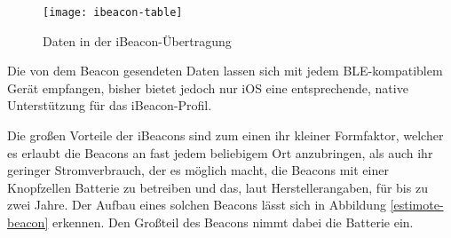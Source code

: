
\begin{figure}[htb!]
		\centering
	\texttt{[image: ibeacon-table]}
	\caption{Daten in der iBeacon-Übertragung}
	\label{ibeacon-table}
\end{figure}


Die von dem Beacon gesendeten Daten lassen sich mit jedem BLE-kompatiblem Gerät empfangen, bisher bietet jedoch nur iOS eine entsprechende, native Unterstützung für das iBeacon-Profil.

Die großen Vorteile der iBeacons sind zum einen ihr kleiner Formfaktor, welcher es erlaubt die Beacons an fast jedem beliebigem Ort anzubringen, als auch ihr geringer Stromverbrauch, der es möglich macht, die Beacons mit einer Knopfzellen Batterie zu betreiben und das, laut Herstellerangaben, für bis zu zwei Jahre.
Der Aufbau eines solchen Beacons lässt sich in Abbildung \ref{estimote-beacon} erkennen. Den Großteil des Beacons nimmt dabei die Batterie ein. 


